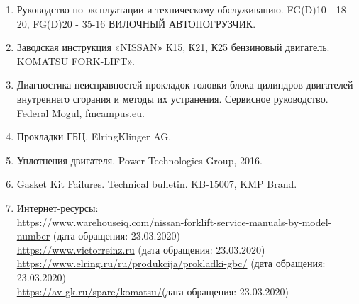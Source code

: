 \begin{enumerate}
%
%
\item  
Руководство по эксплуатации и техническому обслуживанию. FG(D)10 - 18-20, FG(D)20 - 35-16 ВИЛОЧНЫЙ АВТОПОГРУЗЧИК. 
%
\item 
Заводская инструкция «NISSAN» К15, К21, К25 бензиновый двигатель. KOMATSU FORK-LIFT».
%
\item 
Диагностика неисправностей прокладок головки блока цилиндров двигателей внутреннего сгорания и методы их устранения. Сервисное руководство. Federal Mogul,  \url{fmcampus.eu}.
%
\item 
Прокладки ГБЦ. ElringKlinger AG.
%
\item 
Уплотнения двигателя. Power Technologies Group, 2016.
%
\item 
Gasket Kit Failures. Technical bulletin. KB-15007, KMP Brand.
\item Интернет-ресурсы:\\
\url{https://www.warehouseiq.com/nissan-forklift-service-manuals-by-model-number} (дата обращения: 23.03.2020)\\
\url{https://www.victorreinz.ru}  (дата обращения: 23.03.2020)\\
\url{https://www.elring.ru/ru/produkcija/prokladki-gbc/} (дата обращения: 23.03.2020)\\
\url{https://av-gk.ru/spare/komatsu/}(дата обращения: 23.03.2020)\\
%

\end{enumerate}
